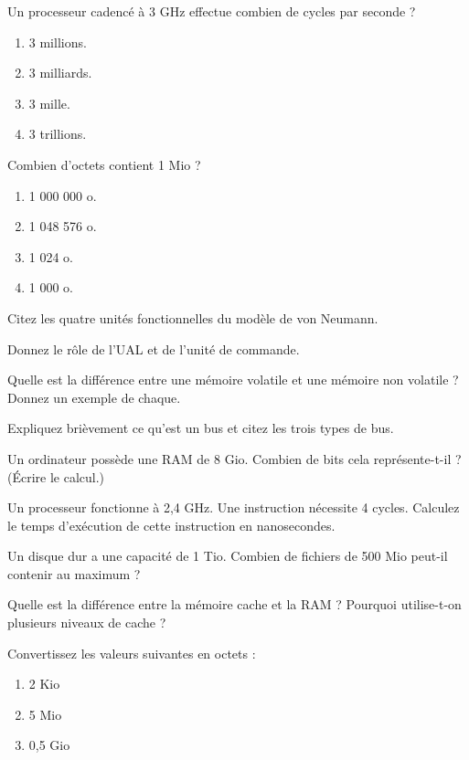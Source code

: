\exo{}
Un processeur cadencé à 3 GHz effectue combien de cycles par seconde ?
\begin{enumerate}
    \item 3 millions.
    \item 3 milliards.
    \item 3 mille.
    \item 3 trillions.
\end{enumerate}

\exo{}
Combien d’octets contient 1 Mio ?
\begin{enumerate}
    \item 1 000 000 o.
    \item 1 048 576 o.
    \item 1 024 o.
    \item 1 000 o.
\end{enumerate}


\exo{}
Citez les quatre unités fonctionnelles du modèle de von Neumann.

\exo{}
Donnez le rôle de l’UAL et de l’unité de commande.

\exo{}
Quelle est la différence entre une mémoire volatile et une mémoire non volatile ? Donnez un exemple de chaque.

\exo{}
Expliquez brièvement ce qu’est un bus et citez les trois types de bus.

\exo{}
Un ordinateur possède une RAM de 8 Gio. Combien de bits cela représente-t-il ? (Écrire le calcul.)

\exo{}
Un processeur fonctionne à 2,4 GHz. Une instruction nécessite 4 cycles. Calculez le temps d’exécution de cette instruction en nanosecondes.

\exo{}
Un disque dur a une capacité de 1 Tio. Combien de fichiers de 500 Mio peut-il contenir au maximum ?

\exo{}
Quelle est la différence entre la mémoire cache et la RAM ? Pourquoi utilise-t-on plusieurs niveaux de cache ?


\exo{}
Convertissez les valeurs suivantes en octets :
\begin{enumerate}
    \item 2 Kio
    \item 5 Mio
    \item 0,5 Gio
\end{enumerate}

